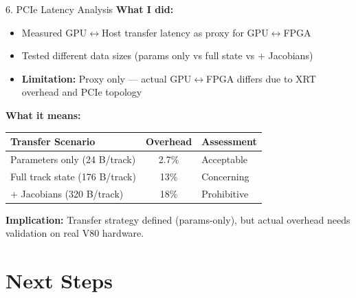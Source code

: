 \documentclass[aspectratio=169, table]{beamer}
\newcommand{\cmark}{\textcolor{acadgreen}{\ding{51}}}
\newcommand{\xmark}{\textcolor{acadred}{\ding{55}}}
\begin{document}
\begin{frame}{6. PCIe Latency Analysis}
\textbf{What I did:}
\begin{itemize}
    \item Measured GPU$\leftrightarrow$Host transfer latency as proxy for GPU$\leftrightarrow$FPGA
    \item Tested different data sizes (params only vs full state vs + Jacobians)
    \item \textbf{Limitation:} Proxy only --- actual GPU$\leftrightarrow$FPGA differs due to XRT overhead and PCIe topology
\end{itemize}

\vspace{0.5em}
\textbf{What it means:}
\begin{table}
\small
\begin{tabular}{lcl}
    \toprule
    \textbf{Transfer Scenario} & \textbf{Overhead} & \textbf{Assessment} \\
    \midrule
    Parameters only (24 B/track) & 2.7\% & \cmark Acceptable \\
    Full track state (176 B/track) & 13\% & Concerning \\
    + Jacobians (320 B/track) & 18\% & \xmark Prohibitive \\
    \bottomrule
\end{tabular}
\end{table}

\textbf{Implication:} Transfer strategy defined (params-only), but actual overhead needs validation on real V80 hardware.
\end{frame}

\section{Next Steps}
\end{document}
